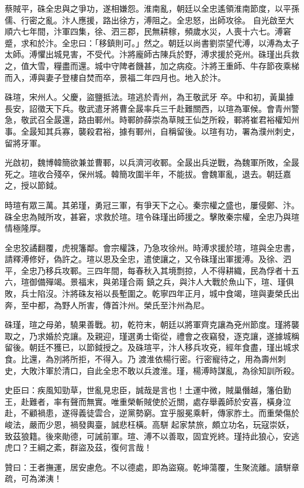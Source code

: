 \begin{pinyinscope}
 蔡賊平，硃全忠與之爭功，遂相嫌怨。淮南亂，朝廷以全忠遙領淮南節度，以平孫儒、行密之亂。汴人應援，路出徐方，溥阻之。全忠怒，出師攻徐。
 自光啟至大順六七年間，汴軍四集，徐、泗三郡，民無耕稼，頻歲水災，人喪十六七。溥窘蹙，求和於汴。全忠曰：「移鎮則可。」然之。朝廷以尚書劉崇望代溥，以溥為太子太師。溥懼出城見害，不受代。汴將龐師古陳兵於野，溥求援於兗州。硃瑾出兵救之，值大雪，糧盡而還。城中守陴者饑甚，加之病疫。汴將王重師、牛存節夜乘梯而入，溥與妻子登樓自焚而卒，景福二年四月也。地入於汴。



 硃瑄，宋州人。父慶，盜鹽抵法。瑄逃於青州，為王敬武牙
 卒。中和初，黃巢據長安，詔徵天下兵。敬武遣牙將曹全晸率兵三千赴難關西，以瑄為軍候。會青州警急，敬武召全晸還，路由鄆州。時鄆帥薛崇為草賊王仙芝所殺，鄆將崔君裕權知州事。全晸知其兵寡，襲殺君裕，據有鄆州，自稱留後。以瑄有功，署為濮州刺史，留將牙軍。



 光啟初，魏博韓簡欲兼並曹鄆，以兵濟河收鄆。全晸出兵逆戰，為魏軍所敗，全晸死之。瑄收合殘卒，保州城。韓簡攻圍半年，不能拔。會魏軍亂，退去。朝廷嘉之，授以節鉞。



 時瑄有眾三萬。其弟瑾，勇冠三軍，有爭天下之心。秦宗權之盛也，屢侵鄭、汴。硃全忠為賊所攻，甚窘，求救於瑄。瑄令硃瑾出師援之。擊敗秦宗權，全忠乃與瑄情極隆厚。



 全忠狡譎翻覆，虎視籓鄰。會宗權誅，乃急攻徐州。時溥求援於瑄，瑄與全忠書，請釋溥修好，偽許之。瑄以恩及全忠，遣使讓之，又令硃瑾出軍援溥。及徐、泗平，全忠乃移兵攻鄆。三四年間，每春秋入其境剽掠，人不得耕織，民為俘者十五六，瑄御備殫竭。景福末，與弟瑾合兩
 鎮之兵，與汴人大戰於魚山下，瑄、瑾俱敗，兵士陷沒。汴將硃友裕以長塹圍之。乾寧四年正月，城中食竭，瑄與妻榮氏出奔，至中都，為野人所害，傳首汴州。榮氏至汴州為尼。



 硃瑾，瑄之母弟，驍果善戰。初，乾符末，朝廷以將軍齊克讓為兗州節度。瑾將襲取之，乃求婚於克讓。及親迎，瑾選勇士衛從，禮會之夜竊發，逐克讓，遂據城稱留後。朝廷不獲已，以節鉞授之。及硃瑄平，汴人移兵攻兗，經年食盡，瑾出城求食。比還，為別將所拒，不得入。乃
 渡淮依楊行密。行密寵待之，用為壽州刺史，大敗汴軍於清口，自此全忠不敢以兵渡淮。瑾，楊溥時謀亂，為徐知訓所殺。



 史臣曰：疾風知勁草，世亂見忠臣，誠哉是言也！土運中微，賊巢僭越，籓伯勤王，赴難者，率有聲而無實。唯重榮斬賊使於近關，處存舉義師於安喜，橫身泣赴，不顧禍患，遂得義徒雲合，逆黨勢窮。宜乎服冕乘軒，傳家胙土。而重榮傷於峻法，嚴而少恩，禍發輿臺，誠悲枉橫。高駢
 起家禁旅，頗立功名，玩寇崇妖，致茲狼籍。後來勛德，可誡前軍。瑄、溥不以善取，固宜兇終。瑾持此狼心，安逃虎口？王綱之紊，群盜及茲，復何言哉！



 贊曰：王者撫運，居安慮危。不以德處，即為盜窺。乾坤蕩覆，生聚流離。讀駢章疏，可為涕洟！



\end{pinyinscope}